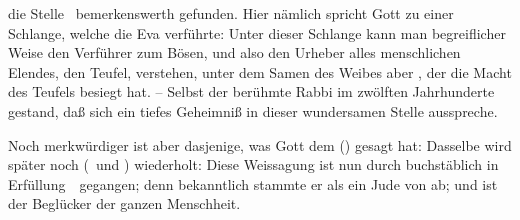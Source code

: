 \begin{aufza}
\item die Stelle \ bemerkenswerth gefunden. Hier nämlich spricht Gott zu einer Schlange, welche die Eva verführte:  Unter dieser Schlange kann man begreiflicher Weise den Verführer zum Bösen, und also den Urheber alles menschlichen Elendes, den Teufel, verstehen, unter dem Samen des Weibes aber , der die Macht des Teufels besiegt hat. -- Selbst der berühmte Rabbi  im zwölften Jahrhunderte gestand, daß sich ein tiefes Geheimniß in dieser wundersamen Stelle ausspreche.
\item Noch merkwürdiger ist aber dasjenige, was Gott dem  () gesagt hat:  Dasselbe wird später noch (\ und ) wiederholt:  Diese Weissagung ist nun durch  buchstäblich in Erfüllung~\ gegangen; denn bekanntlich stammte er als ein Jude von  ab; und ist der Beglücker der ganzen Menschheit.

\end{aufza}
